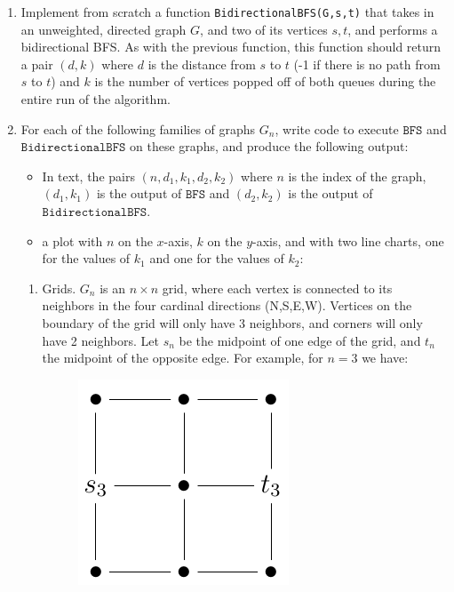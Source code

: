 \documentclass[12pt]{article}
\begin{document}
\begin{enumerate}
\begin{enumerate}
	\item Implement from scratch a function  \texttt{BidirectionalBFS(G,s,t)} that takes in an unweighted, directed graph $G$, and two of its vertices $s,t$, and performs a bidirectional BFS. As with the previous function, this function should return a pair $(d,k)$ where $d$ is the distance from $s$ to $t$ (-1 if there is no path from $s$ to $t$) and $k$ is the number of vertices popped off of both queues during the entire run of the algorithm.
	
	\item For each of the following families of graphs $G_n$, write code to execute $\texttt{BFS}$ and $\texttt{BidirectionalBFS}$ on these graphs, and produce the following output: 
	\begin{itemize}
	\item In text, the pairs $(n,d_1,k_1,d_2,k_2)$ where $n$ is the index of the graph, $(d_1,k_1)$ is the output of $\texttt{BFS}$ and $(d_2, k_2)$ is the output of $\texttt{BidirectionalBFS}$. 
	\item a plot with $n$ on the $x$-axis, $k$ on the $y$-axis, and with two line charts, one for the values of $k_1$ and one for the values of $k_2$:
	\end{itemize}
	
	\begin{enumerate}
	\item Grids. $G_n$ is an $n \times n$ grid, where each vertex is connected to its neighbors in the four cardinal directions (N,S,E,W). Vertices on the boundary of the grid will only have 3 neighbors, and corners will only have 2 neighbors. Let $s_n$ be the midpoint of one edge of the grid, and $t_n$ the midpoint of the opposite edge. For example, for $n=3$ we have:
    \begin{figure}[H]
    \begin{center}
    \includegraphics[scale=0.9]{grid.png} 
    \end{center}
    \end{figure}


\end{enumerate}
\end{enumerate}
\end{enumerate}
\end{document}
